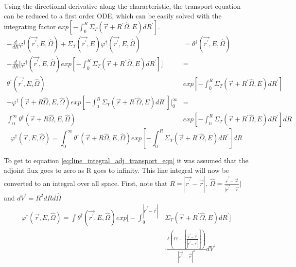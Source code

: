 Using the directional derivative along the characteristic, the transport 
equation can be reduced to a first order ODE, which can be easily solved with 
the integrating factor 
$exp\left[-\int_0^R \Sigma_T(\vec{r}+R^{'}\hat{\Omega},E)dR^{'} \right]$.
\begin{align}
  -\frac{d}{dR}\varphi^{\dagger}(\vec{r^{'}},E,\hat{\Omega}) + 
  \Sigma_T(\vec{r^{'}},E)
  \varphi^{\dagger}(\vec{r^{'}},E,\hat{\Omega}) & = 
  \theta^{\dagger}(\vec{r^{'}},E,\hat{\Omega}) \nonumber \\
  -\frac{d}{dR}\bigg[\varphi^{\dagger}(\vec{r^{'}},E,\hat{\Omega})
    exp\left[-\int_0^R \Sigma_T(\vec{r}+R^{'}\hat{\Omega},E)dR^{'}\right]
    \bigg] & = \nonumber \\
  \theta^{\dagger}(\vec{r^{'}},E,\hat{\Omega})
  &exp\left[-\int_0^R \Sigma_T(\vec{r}+R^{'}\hat{\Omega},E)dR^{'} \right] 
  \nonumber \\
  -\varphi^{\dagger}(\vec{r} + R\hat{\Omega},E,\hat{\Omega})
  exp\left[-\int_0^R \Sigma_T(\vec{r}+R^{'}\hat{\Omega},E)dR^{'}\right] 
  \bigg|_0^{\infty} & = \nonumber \\
  \int_0^{\infty} 
  \theta^{\dagger}(\vec{r} + R\hat{\Omega},E,\hat{\Omega})
  &exp\left[-\int_0^R \Sigma_T(\vec{r}+R^{'}\hat{\Omega},E)dR^{'} \right] dR
  \nonumber 
\end{align}
\begin{equation}
    \varphi^{\dagger}(\vec{r},E,\hat{\Omega}) = 
    \int_0^{\infty} \theta^{\dagger}(\vec{r} + R\hat{\Omega},E,\hat{\Omega})
    exp\left[-\int_0^R \Sigma_T(\vec{r}+R^{'}\hat{\Omega},E)dR^{'} \right] dR
  \label{eq:line_integral_adj_transport_eqn}
\end{equation}

To get to equation \ref{eq:line_integral_adj_transport_eqn} it was assumed that
the adjoint flux goes to zero as R goes to infinity. This line integral will
now be converted to an integral over all space. First, note that 
$R = |\vec{r^{'}} - \vec{r}|$,
$\hat{\Omega} = \frac{\vec{r^{'}} - \vec{r}}{|\vec{r^{'}} - \vec{r}}|$ and
$dV^{'} = R^2dRd\hat{\Omega}$
\begin{equation}
  \begin{split}
    \varphi^{\dagger}(\vec{r},E,\hat{\Omega}) = 
    \int \theta^{\dagger}(\vec{r^{'}},E,\hat{\Omega})
    exp\Big[-\int_0^{|\vec{r^{'}} - \vec{r}|} 
      &\Sigma_T(\vec{r}+R^{'}\hat{\Omega},E)dR^{'} \Big] \\
    &\cdot \frac{\delta \left(\Omega - \left[\frac{\vec{r^{'}} - \vec{r}}
        {|\vec{r^{'}} - \vec{r}|}\right]\right)}
    {|\vec{r^{'}} - \vec{r}|^2} dV^{'}
  \end{split}
  \label{eq:volume_integral_adj_transport_eqn}
\end{equation}


